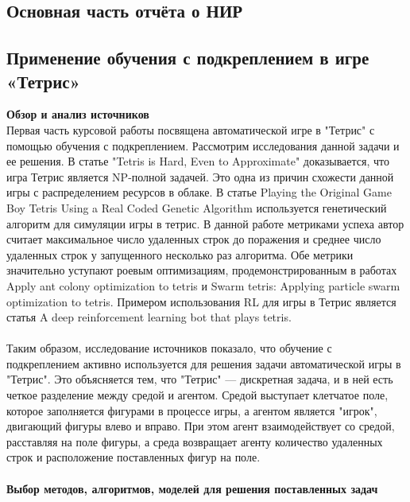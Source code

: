 \documentclass{article}
\begin{document}
\newpage
\begin{center}
\section {Основная часть отчёта о НИР}
\end{center}
\begin{center}
\item\subsection{Применение обучения с подкреплением в игре «Тетрис»}
\end{center}
\textbf{Обзор и анализ источников}\\
Первая часть курсовой работы посвящена автоматической игре в "Тетрис" с помощью обучения с подкреплением. Рассмотрим исследования данной задачи и ее решения. В статье "Tetris is Hard, Even to Approximate"\cite{litlink5} доказывается, что игра Тетрис является NP-полной задачей. Это одна из причин схожести данной игры с распределением ресурсов в облаке\cite{litlink6}. В статье Playing the Original Game Boy Tetris Using a Real Coded Genetic Algorithm\cite{litlink7} используется генетический алгоритм для симуляции игры в тетрис. В данной работе метриками успеха автор считает максимальное число удаленных строк до поражения и среднее число удаленных строк у запущенного несколько раз алгоритма. Обе метрики значительно уступают роевым оптимизациям,  продемонстрированным в работах Apply ant colony optimization to tetris\cite{litlink8} и Swarm tetris: Applying particle swarm optimization to tetris\cite{litlink9}. Примером использования RL для игры в Тетрис является статья A deep reinforcement learning bot that plays tetris\cite{litlink10}.\\~\\
Таким образом, исследование источников показало, что обучение с подкреплением активно используется для решения задачи автоматической игры в "Тетрис". Это объясняется тем, что "Тетрис" — дискретная задача, и в ней есть четкое разделение между средой и агентом. Средой выступает клетчатое поле, которое заполняется фигурами в процессе игры, а агентом является "игрок", двигающий фигуры влево и вправо. При этом агент взаимодействует со средой, расставляя на поле фигуры, а среда возвращает агенту количество удаленных строк и расположение поставленных фигур на поле.\\~\\
\textbf{Выбор методов, алгоритмов, моделей для решения поставленных задач}\\
\end{document}
